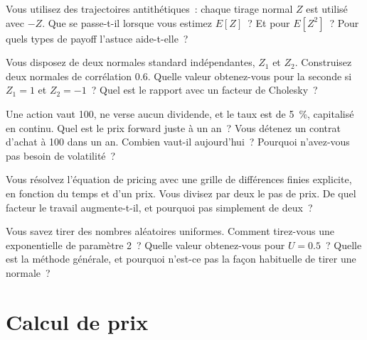 \begin{question}\label{iq:iv2:pricing-and-numerics:9}
Vous utilisez des trajectoires antithétiques~: chaque tirage normal $Z$ est utilisé avec $-Z$. Que se passe-t-il lorsque vous estimez $E[Z]$~? Et pour $E[Z^2]$~? Pour quels types de payoff l'astuce aide-t-elle~?
\end{question}

\begin{question}\label{iq:iv2:pricing-and-numerics:10}
Vous disposez de deux normales standard indépendantes, $Z_1$ et $Z_2$. Construisez deux normales de corrélation 0.6. Quelle valeur obtenez-vous pour la seconde si $Z_1 = 1$ et $Z_2 = -1$~? Quel est le rapport avec un facteur de Cholesky~?
\end{question}

\begin{question}\label{iq:iv2:pricing-and-numerics:11}
Une action vaut 100, ne verse aucun dividende, et le taux est de 5~\%, capitalisé en continu. Quel est le prix forward juste à un an~? Vous détenez un contrat d'achat à 100 dans un an. Combien vaut-il aujourd'hui~? Pourquoi n'avez-vous pas besoin de volatilité~?
\end{question}

\begin{question}\label{iq:iv2:pricing-and-numerics:12}
Vous résolvez l'équation de pricing avec une grille de différences finies explicite, en fonction du temps et d'un prix. Vous divisez par deux le pas de prix. De quel facteur le travail augmente-t-il, et pourquoi pas simplement de deux~?
\end{question}

\begin{question}\label{iq:iv2:pricing-and-numerics:13}
Vous savez tirer des nombres aléatoires uniformes. Comment tirez-vous une exponentielle de paramètre 2~? Quelle valeur obtenez-vous pour $U = 0.5$~? Quelle est la méthode générale, et pourquoi n'est-ce pas la façon habituelle de tirer une normale~?
\end{question}

\section{Calcul de prix}

